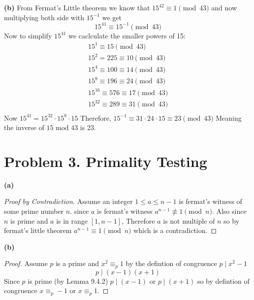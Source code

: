 \documentclass{article}
\begin{document}
\vspace{\baselineskip}
\noindent\textbf{(b)}
From Fermat's Little theorem we know that $15^{42} \equiv 1 \pmod{43}$ and now multiplying both side with $15^{-1}$
we get
\[ 15^{41} \equiv 15^{-1} \pmod{43}\]
Now to simplify $15^{41}$ we caclculate the smaller powers of 15:
\[
\begin{aligned}
15^1 \equiv 15 \pmod{43}\\
15^2 = 225 \equiv 10 \pmod{43}\\
15^4 \equiv 100 \equiv 14 \pmod{43}\\
15^8 \equiv 196 \equiv 24 \pmod{43}\\
15^{16} \equiv 576 \equiv 17 \pmod{43}\\
15^{32} \equiv 289 \equiv 31 \pmod{43}\\
\end{aligned}
\]
Now $15^{41} = 15^{32} \cdot 15^{8} \cdot 15$ Therefore, $15^{-1} \equiv 31 \cdot 24 \cdot 15 \equiv 23 \pmod{43}$
Meaning the inverse of $15 \text{ mod } 43$ is 23.


\section*{Problem 3. Primality Testing}

\textbf{(a)}
\begin{proof}[Proof by Contradiction]
Assume an integer $1 \leq a \leq n - 1$ is fermat's witness of some prime number $n$.
since $a$ is fermat's witness $a^{n-1} \not\equiv 1 \pmod{n}$.
Also since $n$ is prime and $a$ is in range $[1,n-1]$, Therefore $a$ is not multiple of $n$ so
by fermat's little theorem $a^{n-1} \equiv 1 \pmod{n}$ which is a contradiction.
\end{proof}

\vspace{\baselineskip}
\noindent\textbf{(b)}
\begin{proof}
Assume $p$ is a prime and $x^2 \equiv_p 1$ by the defintion of congruence $p \mid x^2 - 1$
\[p \mid (x - 1)(x + 1)\]
Since $p$ is prime (by Lemma 9.4.2) $p \mid (x - 1)$ or $p \mid (x + 1)$ so by defintion of congruence $x \equiv_p -1$ or $x \equiv_p 1$.
\end{proof}
\pagebreak
\end{document}
